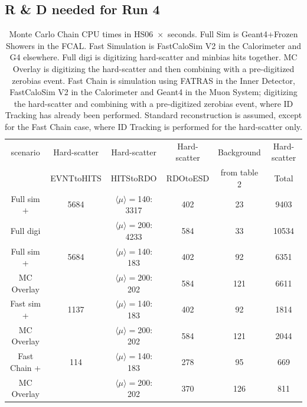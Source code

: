 \subsection{R \& D needed for Run 4} 
\begin{table}[htb!]
  \caption{Monte Carlo Chain CPU times in HS06~$\times$~seconds. Full Sim is Geant4+Frozen Showers in the FCAL. Fast Simulation is FastCaloSim V2 in the Calorimeter and G4 elsewhere. Full digi is digitizing hard-scatter and minbias hits together.
  MC Overlay is digitizing the hard-scatter and then combining with a pre-digitized zerobias event. Fast Chain is simulation using FATRAS in the Inner Detector, FastCaloSim V2 in the Calorimeter and Geant4 in the Muon System; digitizing the hard-scatter and combining with a pre-digitized zerobias event, where ID Tracking has already been performed. Standard reconstruction is assumed, except for the Fast Chain case, where ID Tracking is performed for the hard-scatter only.}
  \label{tab:SimCPU}
  \centering
  \begin{tabular}{|c||c|c|c||c||c|} \hline
    scenario & Hard-scatter & Hard-scatter & Hard-scatter & Background & Hard-scatter \\
             & EVNTtoHITS & HITStoRDO & RDOtoESD & from table 2 & Total \\ \hline
    Full sim $+$ & 5684 & $\langle\mu\rangle=$140: 3317         & 402        & 23 & 9403 \\
    Full digi &   & $\langle\mu\rangle=$200: 4233         & 584        & 33 & 10534 \\   
    Full sim + & 5684 & $\langle\mu\rangle=$140: 183          & 402        & 92 & 6351 \\
    MC Overlay &   & $\langle\mu\rangle=$200: 202 & 584        & 121 & 6611 \\   
    Fast sim + & 1137 & $\langle\mu\rangle=$140: 183          & 402        & 92 & 1814 \\
    MC Overlay &   & $\langle\mu\rangle=$200: 202 & 584        & 121 & 2044 \\
    Fast Chain + & 114 & $\langle\mu\rangle=$140: 183          & 278        & 95 & 669 \\
    MC Overlay &   & $\langle\mu\rangle=$200: 202 & 370        & 126 & 811 \\ \hline
    \end{tabular}
\end{table}

